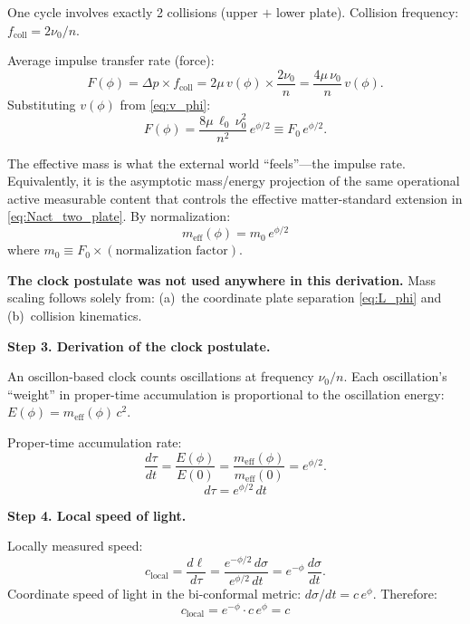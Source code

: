 \documentclass[11pt]{article}
\begin{document}
One cycle involves exactly 2 collisions (upper $+$ lower plate).
Collision frequency: $f_{\mathrm{coll}} = 2\nu_0/n$.

Average impulse transfer rate (force):
\begin{equation}
  F(\phi) = \Delta p \times f_{\mathrm{coll}}
  = 2\mu\,v(\phi) \times \frac{2\nu_0}{n}
  = \frac{4\mu\,\nu_0}{n}\,v(\phi).
  \label{eq:F_phi}
\end{equation}
Substituting $v(\phi)$ from \eqref{eq:v_phi}:
\begin{equation}
  F(\phi) = \frac{8\mu\,\ell_0\,\nu_0^2}{n^2}
  \,e^{\phi/2}
  \equiv F_0\,e^{\phi/2}.
  \label{eq:F_scaling}
\end{equation}

The effective mass is what the external world ``feels''---the
impulse rate.  Equivalently, it is the asymptotic mass/energy projection of
the same operational active measurable content that controls the effective
matter-standard extension in \eqref{eq:Nact_two_plate}.  By normalization:
\begin{equation}
  \boxed{m_{\mathrm{eff}}(\phi) =
  m_0\,e^{\phi/2}}
  \label{eq:mass_from_plates}
\end{equation}
where $m_0 \equiv F_0 \times (\text{normalization factor})$.

\textbf{The clock postulate was not used anywhere in this
derivation.} Mass scaling follows solely from:
(a)~the coordinate plate separation \eqref{eq:L_phi} and
(b)~collision kinematics.

\bigskip
\textbf{Step 3. Derivation of the clock postulate.}

An oscillon-based clock counts oscillations at frequency $\nu_0/n$.
Each oscillation's ``weight'' in proper-time accumulation is
proportional to the oscillation energy:
$E(\phi) = m_{\mathrm{eff}}(\phi)\,c^2$.

Proper-time accumulation rate:
\begin{equation}
  \frac{d\tau}{dt}
  = \frac{E(\phi)}{E(0)}
  = \frac{m_{\mathrm{eff}}(\phi)}{m_{\mathrm{eff}}(0)}
  = e^{\phi/2}.
  \label{eq:clock_from_plates}
\end{equation}
\begin{equation}
  \boxed{d\tau = e^{\phi/2}\,dt}
  \label{eq:clock_final}
\end{equation}

\bigskip
\textbf{Step 4. Local speed of light.}

Locally measured speed:
\begin{equation}
  c_{\mathrm{local}}
  = \frac{d\ell}{d\tau}
  = \frac{e^{-\phi/2}\,d\sigma}{e^{\phi/2}\,dt}
  = e^{-\phi}\,\frac{d\sigma}{dt}.
\end{equation}
Coordinate speed of light in the bi-conformal metric:
$d\sigma/dt = c\,e^{\phi}$. Therefore:
\begin{equation}
  \boxed{c_{\mathrm{local}}
  = e^{-\phi}\cdot c\,e^{\phi} = c}
  \label{eq:c_final}
\end{equation}
\end{document}
